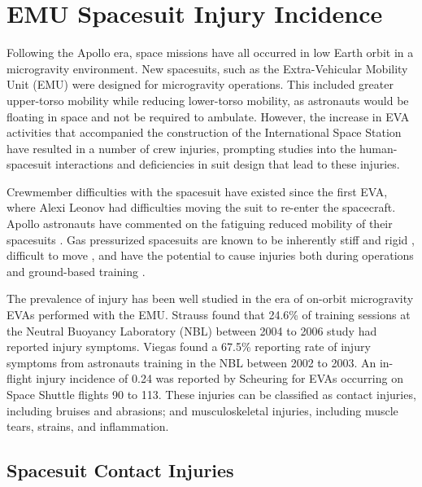 \documentclass[defaultstyle,11pt]{comps}
\begin{document}
\hypertarget{emu-spacesuit-injury-incidence}{%
\section{EMU Spacesuit Injury Incidence}\label{emu-spacesuit-injury-incidence}}

Following the Apollo era, space missions have all occurred in low Earth orbit in a microgravity environment.
New spacesuits, such as the Extra-Vehicular Mobility Unit (EMU) were designed for microgravity operations.
This included greater upper-torso mobility while reducing lower-torso mobility, as astronauts would be floating in space and not be required to ambulate.
However, the increase in EVA activities that accompanied the construction of the International Space Station have resulted in a number of crew injuries, prompting studies into the human-spacesuit interactions and deficiencies in suit design that lead to these injuries.

Crewmember difficulties with the spacesuit have existed since the first EVA, where Alexi Leonov had difficulties moving the suit to re-enter the spacecraft.
Apollo astronauts have commented on the fatiguing reduced mobility of their spacesuits \citep{Scheuring2008}.
Gas pressurized spacesuits are known to be inherently stiff and rigid \citep{Parry1966, Abramov1994, Schmidt2001a, Holschuh2009}, difficult to move \citep{Norcross2009, Amick2015}, and have the potential to cause injuries both during operations and ground-based training \citep{Williams2003, Strauss2004, Scheuring2008, Scheuring2009, Chappell2017}.

The prevalence of injury has been well studied in the era of on-orbit microgravity EVAs performed with the EMU.
Strauss \citep{Strauss2004} found that 24.6\% of training sessions at the Neutral Buoyancy Laboratory (NBL) between 2004 to 2006 study had reported injury symptoms.
Viegas \citep{Viegas2004} found a 67.5\% reporting rate of injury symptoms from astronauts training in the NBL between 2002 to 2003.
An in-flight injury incidence of 0.24 was reported by Scheuring \citep{Scheuring2012} for EVAs occurring on Space Shuttle flights 90 to 113.
These injuries can be classified as contact injuries, including bruises and abrasions; and musculoskeletal injuries, including muscle tears, strains, and inflammation.

\hypertarget{spacesuit-contact-injuries}{%
\subsection{Spacesuit Contact Injuries}\label{spacesuit-contact-injuries}}
\end{document}
